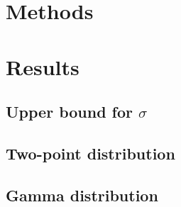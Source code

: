 \documentclass{scrreprt}
\begin{document}
\section{Methods}

  

\section{Results}

  \subsection*{Upper bound for $\sigma$}

    

  \subsection*{Two-point distribution}  

    

  \subsection*{Gamma distribution}

    
\end{document}
